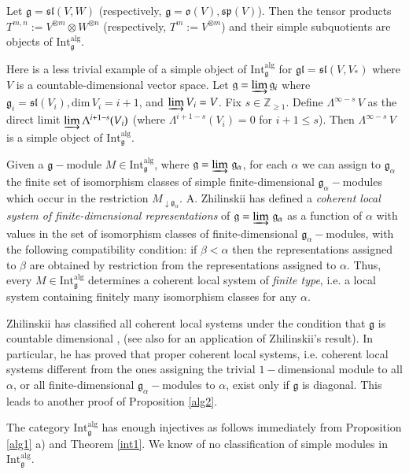 \documentclass[10pt]{amsart}
\renewcommand{\sp}{\mathfrak{sp}}
\renewcommand{\sl}{\mathfrak{sl}}
\newcommand{\oo}{\mathfrak{o}}
\renewcommand{\gg}{\mathfrak{g}}
\newcommand{\Int}{\mathrm{Int}}
\newcommand{\alg}{\mathrm{alg}}
\newcommand{\gl}{\mathfrak{gl}}
\begin{document}
\vspace{0.5cm}

Let $\gg = \sl(V,W)$ (respectively, $\gg = \oo(V), \sp(V)$). Then the tensor products $T^{m,n}:=V^{\otimes m}\otimes W^{\otimes n}$ (respectively, $T^m := V^{\otimes m}$) and their simple subquotients are objects of $\mathrm{Int}_{\gg}^\alg$. 

Here is a less trivial example of a simple object of $\mathrm{Int}_{\gg}^\alg$ for $\gl = \sl(V,V_*)$ where $V$ is a countable-dimensional vector space. Let $\gg =\varinjlim \gg_i$ where $\gg_i = \sl(V_{i}), \mathrm{dim}\,V_i = i+1$, and $\varinjlim V_{i} = V$. Fix $s\in\mathbb Z_{\geq 1}$. Define $\Lambda^{\infty-s}\,V$ as the direct limit $\varinjlim\Lambda^{i+1-s}(V_i)$ (where $\Lambda^{i+1-s}(V_{i})=0$ for $i+1\leq s$). Then $\Lambda^{\infty-s}\,V$ is a simple object of $\mathrm{Int}_{\gg}^\alg$. 

Given a $\gg-$module $M \in \Int_{\gg}^\alg$, where $\gg = \varinjlim\,\gg_{\alpha}$, for each $\alpha$ we can assign to $\gg_{\alpha}$ the finite set of isomorphism classes of simple finite-dimensional $\gg_{\alpha}-$modules which occur in the restriction $M_{\downarrow\gg_{\alpha}}$. A. Zhilinskii has defined a \textit{coherent local system of finite-dimensional representations} of $\gg = \varinjlim\,\gg_{\alpha}$ as a function of $\alpha$ with values in the set of isomorphism classes of finite-dimensional $\gg_{\alpha}-$modules, with the following compatibility condition: if $\beta < \alpha$ then the representations assigned to $\beta$ are obtained by restriction from the representations assigned to $\alpha$. Thus, every $M \in \Int_{\gg}^\alg$ determines a coherent local system of \textit{finite type}, i.e. a local system containing finitely many isomorphism classes for any $\alpha$.

Zhilinskii has classified all coherent local systems under the condition that $\gg$ is countable dimensional \cite{Zh1}, \cite{Zh2} (see also  \cite{PP} for an application of Zhilinskii's result). In particular, he has proved that proper coherent local systems, i.e. coherent local systems different from the ones assigning the trivial $1-$dimensional module to all $\alpha$, or all finite-dimensional $\gg_{\alpha}-$modules to $\alpha$, exist only if $\gg$ is diagonal. This leads to another proof of Proposition \ref{alg2}.

The category  $\mathrm{Int}_{\gg}^\alg$ has enough injectives as follows immediately from Proposition \ref{alg1} a) and Theorem \ref{int1}.
We know of no classification of simple modules in $\Int_{\gg}^\alg$.
\end{document}
